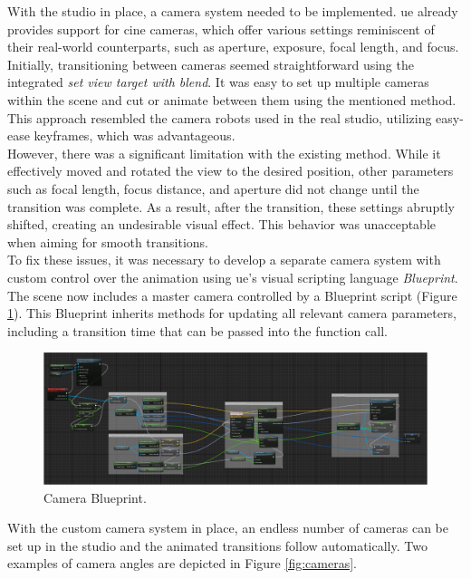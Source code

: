 \documentclass[
  a4paper,  %
  twoside,  %
  bibliography=totoc,
  headsepline,
  cleardoublepage=empty,
  parskip=half,
  draft=false
]{scrbook}
\begin{document}
With the studio in place, a camera system needed to be implemented. \gls{ue} already provides support for cine cameras, which offer various settings reminiscent of their real-world counterparts, such as aperture, exposure, focal length, and focus. Initially, transitioning between cameras seemed straightforward using the integrated \textit{set view target with blend}. It was easy to set up multiple cameras within the scene and cut or animate between them using the mentioned method. This approach resembled the camera robots used in the real studio, utilizing easy-ease keyframes, which was advantageous. \\
However, there was a significant limitation with the existing method. While it effectively moved and rotated the view to the desired position, other parameters such as focal length, focus distance, and aperture did not change until the transition was complete. As a result, after the transition, these settings abruptly shifted, creating an undesirable visual effect. This behavior was unacceptable when aiming for smooth transitions. \\
To fix these issues, it was necessary to develop a separate camera system with custom control over the animation using \gls{ue}'s visual scripting language \textit{Blueprint}. The scene now includes a master camera controlled by a Blueprint script (Figure \ref{fig:blueprint}). This Blueprint inherits methods for updating all relevant camera parameters, including a transition time that can be passed into the function call. 
\begin{figure}[h]
  \centering
  \includegraphics[width=1\textwidth]{graphics/unreal-engine/blueprint.png}
  \caption{Camera Blueprint.}
  \label{fig:blueprint}
\end{figure}
With the custom camera system in place, an endless number of cameras can be set up in the studio and the animated transitions follow automatically. Two examples of camera angles are depicted in Figure \ref{fig:cameras}.
\end{document}
